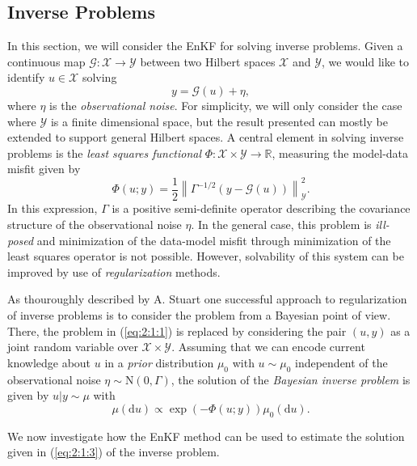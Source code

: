 \documentclass[a4paper,twocolumn,10pt]{article}
\newcommand{\norm}[1]{\left\lVert#1\right\rVert}
\begin{document}
\subsection{Inverse Problems} \label{subsec:2:1}
In this section, we will consider the EnKF for solving inverse problems. Given a continuous
map $\mathcal{G} : \mathcal{X} \rightarrow \mathcal{Y}$ between two Hilbert spaces $\mathcal{X}$
and $\mathcal{Y}$, we would like to identify $u \in \mathcal{X}$ solving 
\begin{equation} \label{eq:2:1:1}
    y = \mathcal{G}(u) + \eta,
\end{equation}
where $\eta$ is the \textit{observational noise}. For simplicity, we will only consider the case where $\mathcal{Y}$
is a finite dimensional space, but the result presented can mostly be extended to support general Hilbert spaces.
A central element in solving inverse problems is the \textit{least squares functional} $\Phi : \mathcal{X} \times \mathcal{Y} \rightarrow \mathbb{R}$, measuring
the model-data misfit
given by
\begin{equation} \label{eq:2:1:2}
    \Phi(u; y) = \frac12\norm{\Gamma^{-1/2}\left(y - \mathcal{G}(u)\right)}_\mathcal{Y}^2.
\end{equation}
In this expression, $\Gamma$ is a positive semi-definite operator describing the covariance
structure of the observational noise $\eta$. In the general case, this problem is \textit{ill-posed}
and minimization of the data-model misfit through minimization of the least squares operator is not
possible. However, solvability of this system can be improved by use of \textit{regularization} methods.

As thouroughly described by A. Stuart \cite{stuart2010inverse} one successful approach to regularization of inverse problems
is to consider the problem from a Bayesian point of view. There, the problem in (\ref{eq:2:1:1}) is replaced
by considering the pair $(u, y)$ as a joint random variable over $\mathcal{X} \times \mathcal{Y}$. Assuming
that we can encode current knowledge about $u$ in a \textit{prior} distribution $\mu_0$ with $u \sim \mu_0$
independent of the observational noise $\eta \sim \text{N}(0, \Gamma)$, the solution of the
\textit{Bayesian inverse problem} is given by $u|y \sim \mu$ with
\begin{equation} \label{eq:2:1:3}
    \mu(\text{d}u) \propto \exp\left(-\Phi(u; y)\right)\mu_0(\text{d}u).
\end{equation}

We now investigate how the EnKF method can be used to estimate the solution given in (\ref{eq:2:1:3}) of the 
inverse problem.
\end{document}
